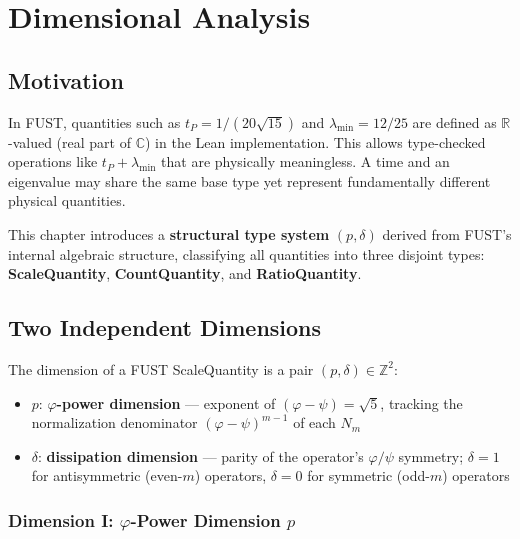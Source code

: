 \chapter{Dimensional Analysis}
\label{chap:dimensional_analysis}

\section{Motivation}
\label{sec:dim_motivation}

In FUST, quantities such as $t_P = 1/(20\sqrt{15})$ and $\lambda_{\min} = 12/25$ are defined as $\mathbb{R}$-valued (real part of $\mathbb{C}$) in the Lean implementation.
This allows type-checked operations like $t_P + \lambda_{\min}$ that are physically meaningless.
A time and an eigenvalue may share the same base type yet represent fundamentally different physical quantities.

This chapter introduces a \textbf{structural type system} $(p, \delta)$ derived from FUST's internal algebraic structure,
classifying all quantities into three disjoint types: \textbf{ScaleQuantity}, \textbf{CountQuantity}, and \textbf{RatioQuantity}.

\section{Two Independent Dimensions}
\label{sec:dim_two_dimensions}

\begin{definition}
\label{def:dim_fdim}
\leanok
The dimension of a FUST ScaleQuantity is a pair $(p, \delta) \in \mathbb{Z}^2$:
\begin{itemize}
\item $p$: \textbf{$\varphi$-power dimension} --- exponent of $(\varphi - \psi) = \sqrt{5}$, tracking the normalization denominator $(\varphi - \psi)^{m-1}$ of each $N_m$
\item $\delta$: \textbf{dissipation dimension} --- parity of the operator's $\varphi/\psi$ symmetry; $\delta = 1$ for antisymmetric (even-$m$) operators, $\delta = 0$ for symmetric (odd-$m$) operators
\end{itemize}
\end{definition}

\subsection{Dimension I: \texorpdfstring{$\varphi$}{φ}-Power Dimension $p$}

